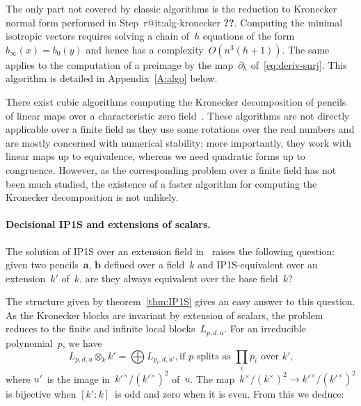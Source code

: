\documentclass{article}%
\makeatletter
\newif\ifapx \apxtrue %
\def\labelenumi{(\roman{enumi})}
\def\itemref#1{\expandafter\ifx\csname r@#1\endcsname\relax
  {\bfseries ??}\else{\setcounter{enumi}{\ref{#1}}\labelenumi}\fi}
\makeatother
\begin{document}
The only part not covered by classic algorithms is the reduction to
Kronecker normal form performed in Step~\itemref{it:alg-kronecker}. Computing
the minimal isotropic vectors requires solving a chain of~$h$ equations
of the form~$b_{∞}(x) = b_0(y)$ and hence has a complexity~$O(n^3(h+1))$.
The same applies to the computation of a preimage by the map~$∂_h$
of~\eqref{eq:deriv-surj}. \ifapx This algorithm is detailed in
Appendix~\ref{A:algo} below. \fi

There exist cubic algorithms computing the Kronecker decomposition of pencils of
linear maps over a characteristic zero field~\cite{beelen1988improved}.
These algorithms are not directly applicable over a finite field as they
use some rotations over the real numbers and are mostly concerned with
numerical stability; more importantly, they work with linear maps up to
equivalence, whereas we need quadratic forms up to congruence. However, as the
corresponding problem over a finite field has not been much studied, the
existence of a faster algorithm for computing the Kronecker decomposition is not
unlikely.

\paragraph{Decisional IP1S and extensions of scalars.}

The solution of IP1S over an extension field
in~\cite{DBLP:journals/corr/BerthomieuFP13} raises the following
question: given two pencils~$\bm{a}$, $\bm{b}$ defined over a field~$k$
and IP1S-equivalent over an extension~$k'$ of~$k$, are they always
equivalent over the base field~$k$?

The structure given by theorem~\ref{thm:IP1S} gives an easy answer
to this question. As the Kronecker blocks are invariant by extension of
scalars, the problem reduces to the finite and infinite local
blocks~$L_{p,d,u}$. For an irreducible polynomial~$p$, we have
\begin{equation}\label{local-extension}
L_{p,d,u} ⊗_{k} k' = %
⨁ L_{p_i,d,u'}, %
\text{if $p$~splits as~$∏_ip_i$ over~$k'$,}
\end{equation}
where $u'$~is the image in~$k'^{×}/(k'^{×})^2$ of~$u$. The
map~$k^{×}/(k^{×})^2 → k'^{×}/(k'^{×})^2$ is bijective when $[k':k]$~is
odd and zero when it is even. From this we deduce:
\end{document}
